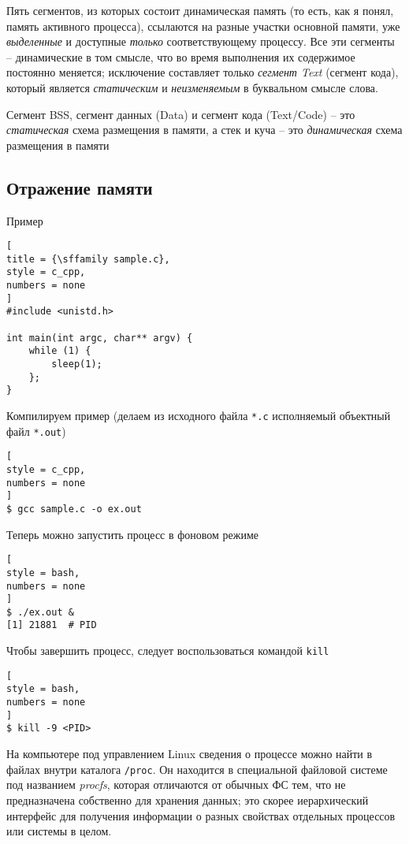 \documentclass[%
	11pt,
	a4paper,
	utf8,
		]{article}
\begin{document}
Пять сегментов, из которых состоит динамическая память (то есть, как я понял, память активного процесса), ссылаются на разные участки основной памяти, уже \emph{выделенные} и доступные \emph{только} соответствующему процессу. Все эти сегменты -- динамические в том смысле, что во время выполнения их содержимое постоянно меняется; исключение составляет только \emph{сегмент Text} (сегмент кода), который является \emph{статическим} и \emph{неизменяемым} в буквальном смысле слова.

{\color{blue} Сегмент BSS, сегмент данных (Data) и сегмент кода (Text/Code) -- это \emph{статическая} схема размещения в памяти, а стек и куча -- это \emph{динамическая} схема размещения в памяти} \cite[]{amini-extreme-c:2022}

\subsection{Отражение памяти}

Пример
\begin{lstlisting}[
title = {\sffamily sample.c},
style = c_cpp,
numbers = none
]
#include <unistd.h>

int main(int argc, char** argv) {
    while (1) {
        sleep(1);
    };
}
\end{lstlisting}

Компилируем пример (делаем из исходного файла \verb|*.c| исполняемый объектный файл \verb|*.out|)
\begin{lstlisting}[
style = c_cpp,
numbers = none	
]
$ gcc sample.c -o ex.out
\end{lstlisting}

Теперь можно запустить процесс в фоновом режиме
\begin{lstlisting}[
style = bash,
numbers = none
]
$ ./ex.out &
[1] 21881  # PID
\end{lstlisting}

Чтобы завершить процесс, следует воспользоваться командой \verb|kill|
\begin{lstlisting}[
style = bash,
numbers = none
]
$ kill -9 <PID>
\end{lstlisting}

На компьютере под управлением Linux сведения о процессе можно найти в файлах внутри каталога \verb|/proc|. Он находится в специальной файловой системе под названием \emph{procfs}, которая отличаются от обычных ФС тем, что не предназначена собственно для хранения данных; это скорее иерархический интерфейс для получения информации о разных свойствах отдельных процессов или системы в целом.
\end{document}
